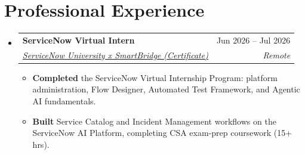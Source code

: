 \documentclass[letterpaper,11pt]{article}
\makeatletter
\newcommand{\resumeItem}[1]{\item\small{#1\vspace{-3pt}}}
\newcommand{\resumeSubheading}[4]{
  \vspace{-2pt}\item
    \begin{tabular*}{0.97\textwidth}[t]{l@{\extracolsep{\fill}}r}
      \small\textbf{#1} & \small #2 \\
      \textit{\small #3} & \textit{\small #4} \\
    \end{tabular*}\vspace{-6pt}}
\newcommand{\resumeSubHeadingListStart}{\begin{itemize}[leftmargin=0.1in,label={},itemsep=0pt]}
\newcommand{\resumeSubHeadingListEnd}{\end{itemize}\vspace{-6pt}}
\newcommand{\resumeItemListStart}{\begin{itemize}[leftmargin=0.2in,itemsep=0pt]\vspace{-2pt}}
\newcommand{\resumeItemListEnd}{\end{itemize}\vspace{-6pt}}
\makeatother
\begin{document}
\section{Professional Experience}
\resumeSubHeadingListStart
\resumeSubheading
{ServiceNow Virtual Intern}{Jun 2026 -- Jul 2026}
{\href{https://drive.google.com/file/d/1nGOD3hbXGv-Ndbgzwqi0jI0sZ7O0UfTW/view?usp=sharing}{ServiceNow University x SmartBridge (Certificate)}}{Remote}
\resumeItemListStart
  \resumeItem{\textbf{Completed} the ServiceNow Virtual Internship Program: platform administration, Flow Designer, Automated Test Framework, and Agentic AI fundamentals.}
  \resumeItem{\textbf{Built} Service Catalog and Incident Management workflows on the ServiceNow AI Platform, completing CSA exam-prep coursework (15+ hrs).}
\resumeItemListEnd
\resumeSubHeadingListEnd
\end{document}
